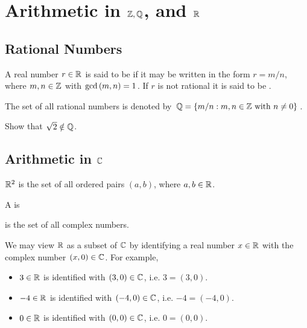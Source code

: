 \documentclass[11pt,fleqn,dvipsnames,usenames]{article}
\renewcommand{\headrulewidth}{1pt}
\newcommand{\blank}[1]{\underline{\hspace{#1}}}
\begin{document}
\fancyhead[L]{\course}
\fancyhead[R]{\term}
\renewcommand{\headrulewidth}{0.4pt}


\setcounter{section}{0}
\section{Arithmetic in \texorpdfstring{$\mathbb{Z}, \mathbb{Q}$, and $\mathbb{R}$}{Z, Q, and R}}
\setcounter{subsection}{3}
\subsection{Rational Numbers}

\recall A real number $r\in\mathbb{R}$ is said to be  if it may be written in the form $r = m/n$, where $m,n\in\mathbb{Z}$ with $\text{gcd}\left(m, n\right) = 1$.  If $r$ is not rational it is said to be .
\vsp

\notation The set of all rational numbers is denoted by $\mathbb{Q} = \left\{m/n:m,n\in\mathbb{Z}\text{ with } n\neq 0\right\}$.

\begin{example}
Show that $\sqrt{2} \notin \mathbb{Q}$.
\end{example}
%
\begin{solution}
\vspace{6cm}

\end{solution}

\subsection{Arithmetic in \texorpdfstring{$\mathbb{C}$}{C}}

\recall $\mathbb{R}^{2}$ is the set of all ordered pairs $(a,b)$, where $a,b\in\mathbb{R}$.

\begin{definition}
A  is
\end{definition}
\vsp

\notation \blank{1cm} is the set of all complex numbers.
\vsp

\begin{remark}
We may view $\mathbb{R}$ as a subset of $\mathbb{C}$ by identifying a real number $x\in\mathbb{R}$ with the complex number $(x,0)\in\mathbb{C}$.  For example,
\begin{itemize}
\item $3\in\mathbb{R}$ is identified with $(3,0)\in\mathbb{C}$, i.e. $3 = (3,0)$.
\item $-4\in\mathbb{R}$ is identified with $(-4,0)\in\mathbb{C}$, i.e. $-4 = (-4,0)$.
\item $0\in\mathbb{R}$ is identified with $(0,0)\in\mathbb{C}$, i.e. $0 = (0,0)$.
\end{itemize}
\end{remark}
\newpage
\end{document}
